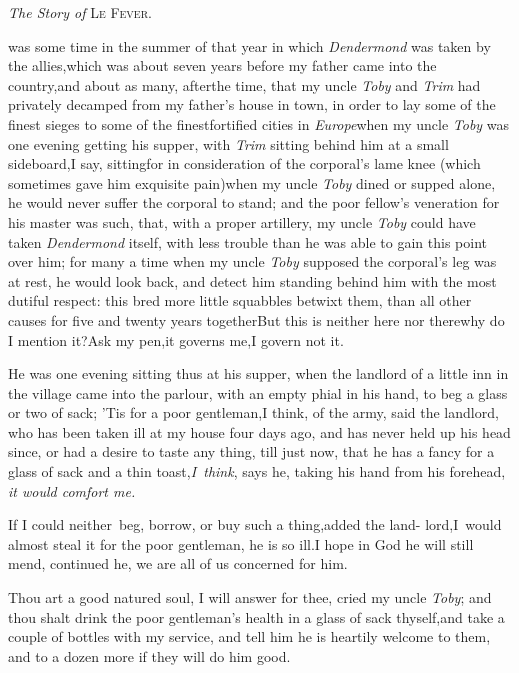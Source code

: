 \documentclass{article}
\begin{document}
\medskip
\centerline{\textit{The Story of} \textsc{Le Fever}.}

 was some time in the summer of
that year in which \textit{Dendermond} was taken by the
allies,\tsk which was about seven years before my father came
into the country,\tsk and about as many, after\break the time, that my
uncle \textit{Toby} and \textit{Trim} had privately decamped from my
father’s house in town, in order to lay some of the finest
sieges to some of the finest\break fortified cities in
\textit{Europe}\tsh when my uncle \textit{Toby} was one
evening getting his supper, with \textit{Trim} sitting behind him at
a small sideboard,\tsk I say, sitting\tsk for
in consideration of the corporal’s lame knee
(which sometimes gave him exqui\-site pain)\tsk when my uncle
\textit{Toby} dined or supped alone, he would never suffer the
corporal to stand; and the poor fellow’s veneration for his
master was such, that, with a proper artillery, my uncle
\textit{Toby} could have taken \textit{Dendermond} itself, with less
trouble than he was able to gain this point over him; for many a
time when my uncle \textit{Toby} supposed the corporal’s leg
was at rest, he would look back, and detect him standing behind him
with the most dutiful respect: this bred more little squabbles
betwixt them, than all other causes for five and twenty years
together\tsk But this is neither here nor there\tsk why do I
mention it?\tsh\break Ask my pen,\tsk it governs me,\tsk I
govern not it.

He was one evening sitting thus at\break
his supper, when the landlord of a little\break
inn in the village came into the parlour,\break
with an empty phial in his hand, to beg\break
a glass or two of sack; ’Tis for a poor\break
gentleman,\tsk I think, of the army, said\break
the landlord, who has been taken ill at\break
my house four days ago, and has never\break
held up his head since, or had a desire\break
to taste any thing, till just now, that\break
he has a fancy for a glass of sack and a\break
thin toast,\tsh \textit{I~think}, says he, taking\break
his hand from his forehead, \textit{it would\break
comfort me.}\tsh

\tsh If I could neither\sic\ beg, borrow,\break
or buy such a thing,\tsk added the land-\break
lord,\tsk I~would almost steal it for the\break
poor gentleman, he is so ill.\tsh I hope\break
in God he will still mend, continued he,\break
\tsk we are all of us concerned for him.

Thou art a good natured soul, I will answer for thee, cried my
uncle \textit{Toby}; and thou shalt drink the poor gentleman’s
health in a glass of sack thyself,\break\tsk and take a couple of
bottles with my service, and tell him he is heartily welcome to
them, and to a dozen more if they will do him good.
\end{document}

